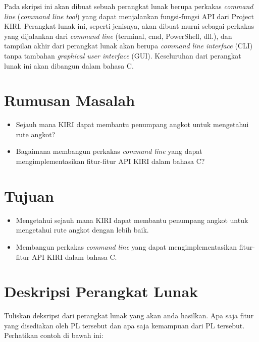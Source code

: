 \documentclass[a4paper,twoside]{article}
\begin{document}
Pada skripsi ini akan dibuat sebuah perangkat lunak berupa perkakas \textit{command line} (\textit{command line tool}) yang dapat menjalankan fungsi-fungsi API dari Project KIRI. Perangkat lunak ini, seperti jenisnya, akan dibuat murni sebagai perkakas yang dijalankan dari \textit{command line} (terminal, cmd, PowerShell, dll.), dan tampilan akhir dari perangkat lunak akan berupa \textit{command line interface} (CLI) tanpa tambahan \textit{graphical user interface} (GUI). Keseluruhan dari perangkat lunak ini akan dibangun dalam bahasa C.

\section{Rumusan Masalah}
\begin{itemize}
	\item Sejauh mana KIRI dapat membantu penumpang angkot untuk mengetahui rute angkot?
	\item Bagaimana membangun perkakas \textit{command line} yang dapat mengimplementasikan fitur-fitur API KIRI dalam bahasa C?
\end{itemize}

\section{Tujuan}
\begin{itemize}
	\item Mengetahui sejauh mana KIRI dapat membantu penumpang angkot untuk mengetahui rute angkot dengan lebih baik.
	\item Membangun perkakas \textit{command line} yang dapat mengimplementasikan fitur-fitur API KIRI dalam bahasa C.
\end{itemize}

\section{Deskripsi Perangkat Lunak}
Tuliskan deksripsi dari perangkat lunak yang akan anda hasilkan. Apa saja fitur yang disediakan oleh PL tersebut dan apa saja kemampuan dari PL tersebut. Perhatikan contoh di bawah ini:
\end{document}
